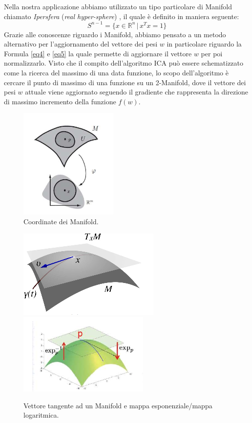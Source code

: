 \documentclass[final]{siamltex}
\begin{document}
Nella nostra applicazione abbiamo utilizzato un tipo particolare di Manifold chiamato \textit{Ipersfera} (\textit{real hyper-sphere}) \cite{documentofiori}, il quale \`{e} definito in maniera seguente:
%
\begin{equation}
S^{n-1} = \{ x \in \mathbb{R}^n \, | \, x^Tx=1 \}
\end{equation}
%
Grazie alle conoscenze riguardo i Manifold, abbiamo pensato a un metodo alternativo per l'aggiornamento del vettore dei pesi $w$ in particolare riguardo la Formula \eqref{eq4} e \eqref{eq5} la quale permette di aggiornare il vettore $w$ per poi normalizzarlo. Visto che il compito dell'algoritmo ICA pu\`{o} essere schematizzato come la ricerca del massimo di una data funzione, lo scopo dell'algoritmo \`{e} cercare il punto di massimo di una funzione su un 2-Manifold, dove il vettore dei pesi $w$ attuale viene aggiornato seguendo il gradiente che rappresenta la direzione di massimo incremento della funzione $f(w)$. \\
%
\begin{figure}[h!]
\begin{center}
\includegraphics[width=0.3\columnwidth]{manifold1.png}
\caption{Coordinate dei Manifold.}
\label{imag:manifold1}
\end{center}
\end{figure}
% 
%
\begin{figure}[h!]
\begin{center}
\includegraphics[width=0.3\columnwidth]{manifold3.png}
\includegraphics[width=0.3\columnwidth]{manifold4.png}
\caption{Vettore tangente ad un Manifold e mappa esponenziale/mappa logaritmica.}
\label{imag:manifold3}
\end{center}
\end{figure}
\end{document}
